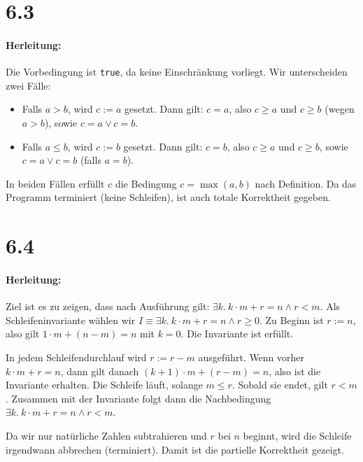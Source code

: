 \documentclass[a4paper,12pt]{article}
\begin{document}
\section*{6.3}

\paragraph{Herleitung:} Die Vorbedingung ist \texttt{true}, da keine Einschränkung vorliegt. Wir unterscheiden zwei Fälle:

\begin{itemize}
  \item Falls $a > b$, wird $c := a$ gesetzt. Dann gilt: $c = a$, also $c \geq a$ und $c \geq b$ (wegen $a > b$), sowie $c = a \lor c = b$.
  \item Falls $a \leq b$, wird $c := b$ gesetzt. Dann gilt: $c = b$, also $c \geq a$ und $c \geq b$, sowie $c = a \lor c = b$ (falls $a = b$).
\end{itemize}

In beiden Fällen erfüllt $c$ die Bedingung $c = \max(a, b)$ nach Definition. Da das Programm terminiert (keine Schleifen), ist auch totale Korrektheit gegeben.



\section*{6.4}

\paragraph{Herleitung:} Ziel ist es zu zeigen, dass nach Ausführung gilt: $\exists k.\ k \cdot m + r = n \land r < m$. Als Schleifeninvariante wählen wir $I \equiv \exists k.\ k \cdot m + r = n \land r \geq 0$. Zu Beginn ist $r := n$, also gilt $1 \cdot m + (n - m) = n$ mit $k = 0$. Die Invariante ist erfüllt.

In jedem Schleifendurchlauf wird $r := r - m$ ausgeführt. Wenn vorher $k \cdot m + r = n$, dann gilt danach $(k+1) \cdot m + (r - m) = n$, also ist die Invariante erhalten. Die Schleife läuft, solange $m \leq r$. Sobald sie endet, gilt $r < m$. Zusammen mit der Invariante folgt dann die Nachbedingung $\exists k.\ k \cdot m + r = n \land r < m$.

Da wir nur natürliche Zahlen subtrahieren und $r$ bei $n$ beginnt, wird die Schleife irgendwann abbrechen (terminiert). Damit ist die partielle Korrektheit gezeigt.
\end{document}
